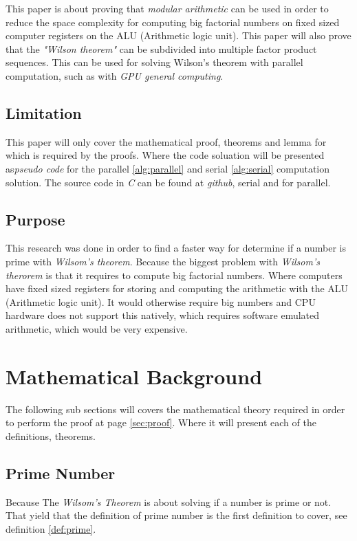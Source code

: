 \documentclass[12pt, oneside, onecolumn]{article}
\begin{document}
This paper is about proving that \emph{modular arithmetic} can be used in order to reduce the space complexity for computing big factorial numbers on fixed sized computer registers on the ALU (Arithmetic logic unit). This paper will also prove that the \emph{"Wilson theorem"} can be subdivided into multiple factor product sequences. This can be used for solving Wilson's theorem with parallel computation, such as with \emph{GPU general computing}.


\subsection{Limitation}
This paper will only cover the mathematical proof, theorems and lemma for which is required by the proofs. Where the code soluation will be presented as\emph{pseudo code} for the parallel \ref{alg:parallel} and serial \ref{alg:serial} computation solution. The source code in \emph{C} can be found at \emph{github}, serial\cite{wprime} and for parallel\cite{clwprime}.


\subsection{Purpose}
This research was done in order to find a faster way for determine if a number is prime with \emph{Wilsom's theorem}. Because the biggest problem with \emph{Wilsom's therorem} is that it requires to compute big factorial numbers. Where computers have fixed sized registers for storing and computing the arithmetic with the ALU (Arithmetic logic unit). It would otherwise require big numbers and CPU hardware does not support this natively, which requires software emulated arithmetic, which would be very expensive.

\section{Mathematical Background}
The following sub sections will covers the mathematical theory required in order to perform the proof at page \ref{sec:proof}. Where it will present each of the definitions, theorems.

\subsection{Prime Number}
Because The \emph{Wilsom's Theorem} is about solving if a number is prime or not. That yield that the definition of prime number is the first definition to cover, see definition \ref{def:prime}.
\end{document}
